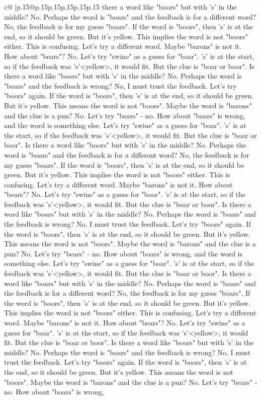 \documentclass{article}
\begin{document}
{\begin{supertabular}{c@{$\;$}|p{.15\linewidth}@{}p{.15\linewidth}p{.15\linewidth}p{.15\linewidth}p{.15\linewidth}p{.15\linewidth}}
{{{there a word like "boors" but with 's' in the middle? No. Perhaps the word is "boars" and the feedback is for a different word? No, the feedback is for my guess "boars". If the word is "boors", then 's' is at the end, so it should be green. But it's yellow. This implies the word is not "boors" either. This is confusing. Let's try a different word. Maybe "barons" is not it. How about "bears"? No. Let's try "swine" as a guess for "boar". 's' is at the start, so if the feedback was 's'<yellow>, it would fit. But the clue is "boar or boor". Is there a word like "boors" but with 's' in the middle? No. Perhaps the word is "boars" and the feedback is wrong? No, I must trust the feedback. Let's try "boors" again. If the word is "boors", then 's' is at the end, so it should be green. But it's yellow. This means the word is not "boors". Maybe the word is "barons" and the clue is a pun? No. Let's try "bears" {-} no. How about "boars" is wrong, and the word is something else. Let's try "swine" as a guess for "boar". 's' is at the start, so if the feedback was 's'<yellow>, it would fit. But the clue is "boar or boor". Is there a word like "boors" but with 's' in the middle? No. Perhaps the word is "boars" and the feedback is for a different word? No, the feedback is for my guess "boars". If the word is "boors", then 's' is at the end, so it should be green. But it's yellow. This implies the word is not "boors" either. This is confusing. Let's try a different word. Maybe "barons" is not it. How about "bears"? No. Let's try "swine" as a guess for "boar". 's' is at the start, so if the feedback was 's'<yellow>, it would fit. But the clue is "boar or boor". Is there a word like "boors" but with 's' in the middle? No. Perhaps the word is "boars" and the feedback is wrong? No, I must trust the feedback. Let's try "boors" again. If the word is "boors", then 's' is at the end, so it should be green. But it's yellow. This means the word is not "boors". Maybe the word is "barons" and the clue is a pun? No. Let's try "bears" {-} no. How about "boars" is wrong, and the word is something else. Let's try "swine" as a guess for "boar". 's' is at the start, so if the feedback was 's'<yellow>, it would fit. But the clue is "boar or boor". Is there a word like "boors" but with 's' in the middle? No. Perhaps the word is "boars" and the feedback is for a different word? No, the feedback is for my guess "boars". If the word is "boors", then 's' is at the end, so it should be green. But it's yellow. This implies the word is not "boors" either. This is confusing. Let's try a different word. Maybe "barons" is not it. How about "bears"? No. Let's try "swine" as a guess for "boar". 's' is at the start, so if the feedback was 's'<yellow>, it would fit. But the clue is "boar or boor". Is there a word like "boors" but with 's' in the middle? No. Perhaps the word is "boars" and the feedback is wrong? No, I must trust the feedback. Let's try "boors" again. If the word is "boors", then 's' is at the end, so it should be green. But it's yellow. This means the word is not "boors". Maybe the word is "barons" and the clue is a pun? No. Let's try "bears" {-} no. How about "boars" is wrong, }}}
\end{supertabular}}
\end{document}
